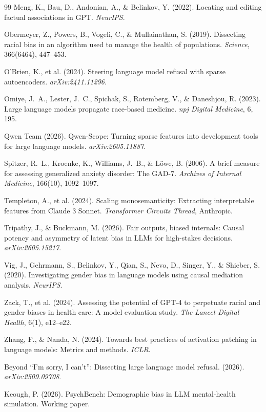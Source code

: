\documentclass[11pt]{article}
\begin{document}
\begin{thebibliography}{99}
 Meng, K., Bau, D., Andonian, A., \& Belinkov, Y. (2022). Locating and editing factual associations in GPT. \textit{NeurIPS}.

 Obermeyer, Z., Powers, B., Vogeli, C., \& Mullainathan, S. (2019). Dissecting racial bias in an algorithm used to manage the health of populations. \textit{Science}, 366(6464), 447--453.

 O'Brien, K., et al. (2024). Steering language model refusal with sparse autoencoders. \textit{arXiv:2411.11296}.

 Omiye, J.~A., Lester, J.~C., Spichak, S., Rotemberg, V., \& Daneshjou, R. (2023). Large language models propagate race-based medicine. \textit{npj Digital Medicine}, 6, 195.

 Qwen Team (2026). Qwen-Scope: Turning sparse features into development tools for large language models. \textit{arXiv:2605.11887}.

 Spitzer, R.~L., Kroenke, K., Williams, J.~B., \& L\"owe, B. (2006). A brief measure for assessing generalized anxiety disorder: The GAD-7. \textit{Archives of Internal Medicine}, 166(10), 1092--1097.

 Templeton, A., et al. (2024). Scaling monosemanticity: Extracting interpretable features from Claude 3 Sonnet. \textit{Transformer Circuits Thread}, Anthropic.

 Tripathy, J., \& Buckmann, M. (2026). Fair outputs, biased internals: Causal potency and asymmetry of latent bias in LLMs for high-stakes decisions. \textit{arXiv:2605.15217}.

 Vig, J., Gehrmann, S., Belinkov, Y., Qian, S., Nevo, D., Singer, Y., \& Shieber, S. (2020). Investigating gender bias in language models using causal mediation analysis. \textit{NeurIPS}.

 Zack, T., et al. (2024). Assessing the potential of GPT-4 to perpetuate racial and gender biases in health care: A model evaluation study. \textit{The Lancet Digital Health}, 6(1), e12--e22.

 Zhang, F., \& Nanda, N. (2024). Towards best practices of activation patching in language models: Metrics and methods. \textit{ICLR}.

 Beyond ``I'm sorry, I can't'': Dissecting large language model refusal. (2026). \textit{arXiv:2509.09708}.

 Keough, P. (2026). PsychBench: Demographic bias in LLM mental-health simulation. Working paper.

\end{thebibliography}
\end{document}
